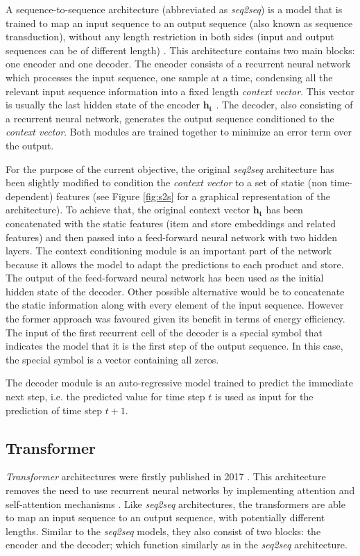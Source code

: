 A sequence-to-sequence architecture (abbreviated as \textit{seq2seq}) is a model that is trained to map an input sequence to an output sequence (also known as sequence transduction), without any length restriction in both sides (input and output sequences can be of different length) \autocite{sutskever2014}. This architecture contains two main blocks: one encoder and one decoder. The encoder consists of a recurrent neural network which processes the input sequence, one sample at a time, condensing all the relevant input sequence information into a fixed length \textit{context vector}. This vector is usually the last hidden state of the encoder $\mathbf{h_t}$ \autocite{uday2019}. The decoder, also consisting of a recurrent neural network, generates the output sequence conditioned to the \textit{context vector}. Both modules are trained together to minimize an error term over the output.



For the purpose of the current objective, the original \textit{seq2seq} architecture has been slightly modified to condition the \textit{context vector} to a set of static (non time-dependent) features (see Figure \ref{fig:s2s} for a graphical representation of the architecture). To achieve that, the original context vector $\mathbf{h_t}$ has been concatenated with the static features (item and store embeddings and related features) and then passed into a feed-forward neural network with two hidden layers. The context conditioning module is an important part of the network because it allows the model to adapt the predictions to each product and store. The output of the feed-forward neural network has been used as the initial hidden state of the decoder. Other possible alternative would be to concatenate the static information along with every element of the input sequence. However the former approach was favoured given its benefit in terms of energy efficiency. The input of the first recurrent cell of the decoder is a special symbol that indicates the model that it is the first step of the output sequence. In this case, the special symbol is a vector containing all zeros.

The decoder module is an auto-regressive model trained to predict the immediate next step, i.e. the predicted value for time step $t$ is used as input for the prediction of time step $t+1$.



\subsection{Transformer}
\textit{Transformer} architectures were firstly published  in 2017 \autocite{vaswani2017}. This architecture removes the need to use recurrent neural networks by implementing attention and self-attention mechanisms \autocite{bahdanau2015}.  Like \textit{seq2seq} architectures, the transformers are able to map an input sequence to an output sequence, with potentially different lengths. Similar to the \textit{seq2seq} models, they also consist of two blocks: the encoder and the decoder; which function similarly as in the \textit{seq2seq} architecture.

